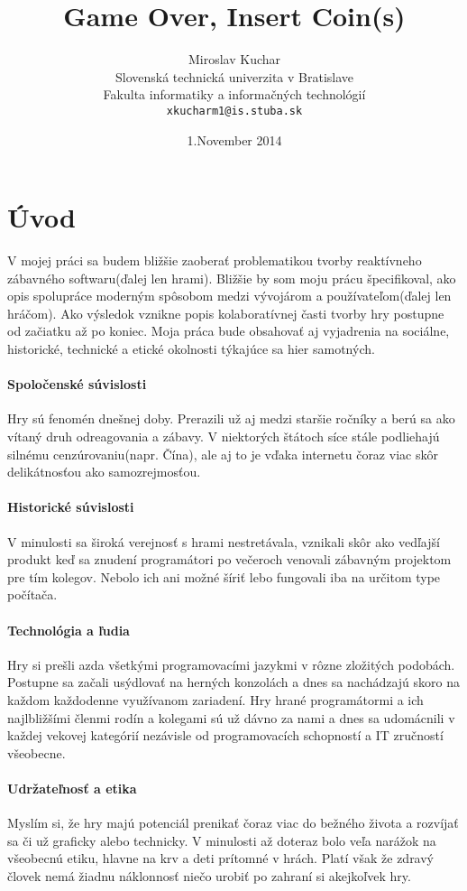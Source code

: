 \documentclass[10pt,twoside,slovak,a4paper]{article}
\title{Game Over, Insert Coin(s)}
\author{Miroslav Kuchar\\[2pt]
	{\small Slovenská technická univerzita v Bratislave}\\
	{\small Fakulta informatiky a informačných technológií}\\
	{\small \texttt{xkucharm1@is.stuba.sk}}
	}
\date{\small 1.November 2014} %
\begin{document}
\maketitle

\section{Úvod}  \label{uvod}

V mojej práci sa budem bližšie zaoberať problematikou tvorby reaktívneho zábavného softwaru(ďalej len hrami). Bližšie by som moju prácu špecifikoval, ako opis spolupráce moderným spôsobom medzi vývojárom a používateľom(ďalej len hráčom). Ako výsledok vznikne popis kolaboratívnej časti tvorby hry postupne od začiatku až po koniec. Moja práca bude obsahovať aj vyjadrenia na sociálne, historické, technické a etické okolnosti týkajúce sa hier samotných.\cite{NST:Understanding}


\paragraph{Spoločenské súvislosti}
Hry sú fenomén dnešnej doby. Prerazili už aj medzi staršie ročníky a berú sa ako vítaný druh odreagovania a zábavy. V niektorých štátoch síce stále podliehajú silnému cenzúrovaniu(napr. Čína), ale aj to je vďaka internetu čoraz viac skôr delikátnosťou ako samozrejmosťou.
\paragraph{Historické súvislosti}
V minulosti sa široká verejnosť s hrami nestretávala, vznikali skôr ako vedľajší produkt keď sa znudení programátori po večeroch venovali zábavným projektom pre tím kolegov. Nebolo ich ani možné šíriť lebo fungovali iba na určitom type počítača.
\paragraph{Technológia a ľudia}
Hry si prešli azda všetkými programovacími jazykmi v rôzne zložitých podobách. Postupne sa začali usýdlovať na herných konzolách a dnes sa nachádzajú skoro na každom každodenne využívanom zariadení. Hry hrané programátormi a ich najlbližšími členmi rodín a kolegami sú už dávno za nami a dnes sa udomácnili v každej vekovej kategórií nezávisle od programovacích schopností a IT zručností všeobecne.
\paragraph{Udržateľnosť a etika}
Myslím si, že hry majú potenciál prenikať čoraz viac do bežného života a rozvíjať sa či už graficky alebo technicky. V minulosti až doteraz bolo veľa narážok na všeobecnú etiku, hlavne na krv a deti prítomné v hrách. Platí však že zdravý človek nemá žiadnu náklonnosť niečo urobiť po zahraní si akejkoľvek hry.
\end{document}
